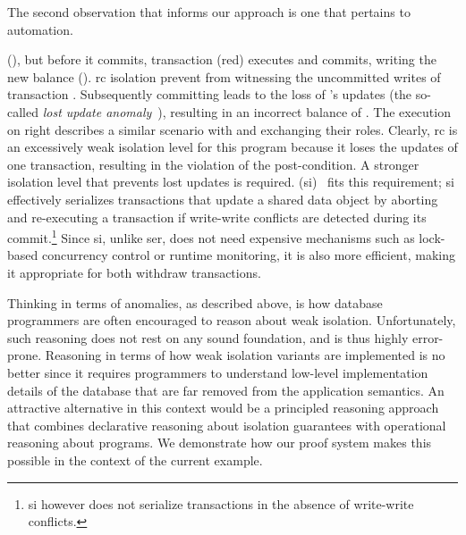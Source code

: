 The second observation that informs our approach is one that pertains
to automation.

\newpage

(), but before it commits, transaction  (red) executes
and commits, writing the new balance (). {\sc rc} isolation
prevent  from witnessing the uncommitted writes of transaction
.  Subsequently committing  leads to the loss of
's updates (the so-called \emph{lost update
anomaly}~\cite{berenson}), resulting in an incorrect balance of
. The execution on right describes a similar scenario with
 and  exchanging their roles.  Clearly, {\sc rc} is an
excessively weak isolation level for this program because it loses the
updates of one transaction, resulting in the violation of the
post-condition.  A stronger isolation level that prevents lost updates
is required.  ({\sc si})~\cite{berenson} fits
this requirement; {\sc si} effectively serializes transactions that
update a shared data object by aborting and re-executing a transaction
if write-write conflicts are detected during its commit.\footnote{{\sc
si} however does not serialize transactions in the absence of
write-write conflicts.} Since {\sc si}, unlike {\sc ser}, does not
need expensive mechanisms such as lock-based concurrency control or
runtime monitoring, it is also more efficient, making it appropriate
for both withdraw transactions.

Thinking in terms of anomalies, as described above, is how database
programmers are often encouraged to reason about weak isolation.
Unfortunately, such reasoning does not rest on any sound foundation,
and is thus highly error-prone. Reasoning in terms of how weak
isolation variants are implemented is no better since it requires
programmers to understand low-level implementation details of the
database that are far removed from the application semantics. An
attractive  alternative in this context would be a principled
reasoning approach that combines declarative reasoning about isolation
guarantees with operational reasoning about programs. We demonstrate
how our proof system makes this possible in the context of the current
example.

